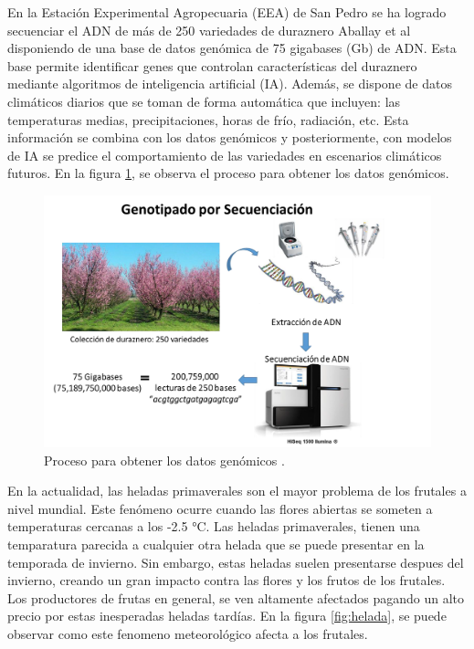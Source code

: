 En la  Estación Experimental Agropecuaria (EEA) de San Pedro se ha logrado secuenciar el ADN de más de 250 variedades de duraznero Aballay et al \cite{ARTICLE:1} disponiendo de una base de datos genómica de 75 gigabases (Gb) de ADN. Esta base permite identificar genes que controlan características del duraznero mediante algoritmos de inteligencia artificial (IA). Además, se dispone de datos climáticos diarios que se toman de forma automática que incluyen: las temperaturas medias, precipitaciones, horas de frío, radiación, etc. Esta información se combina con los datos genómicos y posteriormente, con modelos de IA se predice el comportamiento de las variedades en escenarios climáticos futuros. En la figura \ref{fig:genotipado}, se observa el proceso para obtener los datos genómicos.

\begin{figure}[ht]
	\centering
	\includegraphics[scale=.2]{./Figures/genotipado.png}
	\caption{Proceso para obtener los datos genómicos \cite{ARTICLE:1}.}
	\label{fig:genotipado}
\end{figure}

En la actualidad, las heladas primaverales son el mayor problema de los frutales a nivel mundial. Este fenómeno ocurre cuando las flores abiertas se someten a temperaturas cercanas a los -2.5 °C. Las heladas primaverales, tienen una temparatura parecida a cualquier otra helada que se puede presentar en la temporada de invierno. Sin embargo, estas heladas suelen presentarse despues del invierno, creando un gran impacto contra las flores y los frutos de los frutales. Los productores de frutas en general, se ven altamente afectados pagando un alto precio por estas inesperadas heladas tardías. En la figura \ref{fig:helada}, se puede observar como este fenomeno meteorológico afecta a los frutales.

